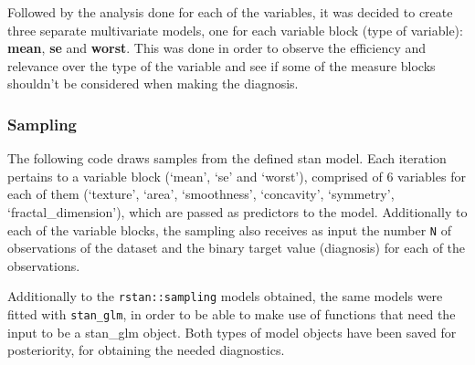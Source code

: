 \documentclass[
]{article}
\begin{document}
Followed by the analysis done for each of the variables, it was decided
to create three separate multivariate models, one for each variable
block (type of variable): \textbf{mean}, \textbf{se} and \textbf{worst}.
This was done in order to observe the efficiency and relevance over the
type of the variable and see if some of the measure blocks shouldn't be
considered when making the diagnosis.

\hypertarget{sampling-1}{%
\subsubsection{Sampling}\label{sampling-1}}

The following code draws samples from the defined stan model. Each
iteration pertains to a variable block (`mean', `se' and `worst'),
comprised of 6 variables for each of them (`texture', `area',
`smoothness', `concavity', `symmetry', `fractal\_dimension'), which are
passed as predictors to the model. Additionally to each of the variable
blocks, the sampling also receives as input the number \texttt{N} of
observations of the dataset and the binary target value (diagnosis) for
each of the observations.

Additionally to the \texttt{rstan::sampling} models obtained, the same
models were fitted with \texttt{stan\_glm}, in order to be able to make
use of functions that need the input to be a stan\_glm object. Both
types of model objects have been saved for posteriority, for obtaining
the needed diagnostics.
\end{document}
